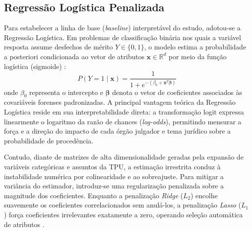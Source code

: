 \documentclass[conference]{IEEEtran}
\begin{document}
\subsection{Regressão Logística Penalizada}
Para estabelecer a linha de base (\textit{baseline}) interpretável do estudo, adotou-se a Regressão Logística. Em problemas de classificação binária nos quais a variável resposta assume desfechos de mérito $Y \in \{0, 1\}$, o modelo estima a probabilidade a posteriori condicionada ao vetor de atributos $\mathbf{x} \in \mathbb{R}^d$ por meio da função logística (sigmoide) \cite{izbicki2020}:
\begin{equation}
P(Y=1 \mid \mathbf{x}) = \frac{1}{1 + e^{-(\beta_0 + \mathbf{x}^T \boldsymbol{\beta})}}
\label{eq:logistic}
\end{equation}
onde $\beta_0$ representa o intercepto e $\boldsymbol{\beta}$ denota o vetor de coeficientes associados às covariáveis forenses padronizadas. A principal vantagem teórica da Regressão Logística reside em sua interpretabilidade direta: a transformação logit expressa linearmente o logaritmo da razão de chances (\textit{log-odds}), permitindo mensurar a força e a direção do impacto de cada órgão julgador e tema jurídico sobre a probabilidade de procedência.

Contudo, diante de matrizes de alta dimensionalidade geradas pela expansão de variáveis categóricas e assuntos da TPU, a estimação irrestrita conduz à instabilidade numérica por colinearidade e ao sobreajuste. Para mitigar a variância do estimador, introduz-se uma regularização penalizada sobre a magnitude dos coeficientes. Enquanto a penalização \textit{Ridge} ($L_2$) encolhe suavemente os coeficientes correlacionados sem anulá-los, a penalização \textit{Lasso} ($L_1$) força coeficientes irrelevantes exatamente a zero, operando seleção automática de atributos \cite{tibshirani1996, izbicki2020}.
\end{document}

